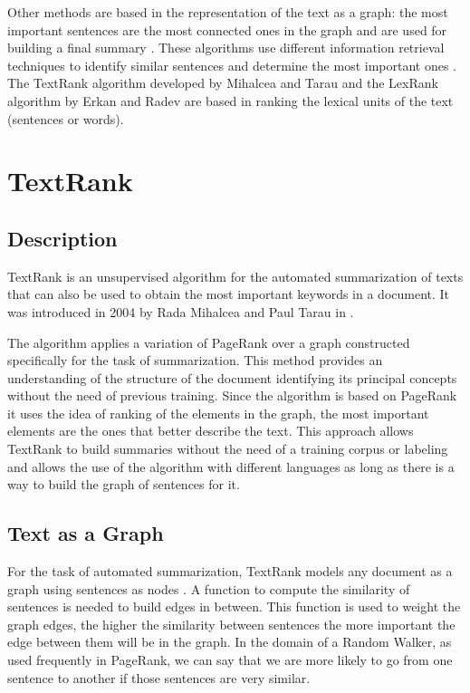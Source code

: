 \documentclass{llncs}
\begin{document}
Other methods are based in the representation of the text as a graph: the most important sentences are the most connected ones in the graph and are used for building a final summary \cite{barzilay}. These algorithms use different information retrieval techniques to identify similar sentences and determine the most important ones \cite{salton}. The TextRank algorithm developed by Mihalcea and Tarau \cite{mihalcea-tarau} and the LexRank algorithm by Erkan and Radev \cite{erkan} are based in ranking the lexical units of the text (sentences or words).

\section{TextRank}

\subsection{Description}
TextRank is an unsupervised algorithm for the automated summarization of texts that can also be used to obtain the most important keywords in a document. It was introduced in 2004 by Rada Mihalcea and Paul Tarau in \cite{mihalcea-tarau}.

The algorithm applies a variation of PageRank \cite{pageetal98} over a graph constructed specifically for the task of summarization. This method provides an understanding of the structure of the document identifying its principal concepts without the need of previous training. Since the algorithm is based on PageRank it uses the idea of ranking of the elements in the graph, the most important elements are the ones that better describe the text. This approach allows TextRank to build summaries without the need of a training corpus or labeling and allows the use of the algorithm with different languages as long as there is a way to build the graph of sentences for it.

\subsection{Text as a Graph}
For the task of automated summarization, TextRank models any document as a graph using sentences as nodes \cite{introductionir}. A function to compute the similarity of sentences is needed to build edges in between. This function is used to weight the graph edges, the higher the similarity between sentences the more important the edge between them will be in the graph. In the domain of a Random Walker, as used frequently in PageRank, we can say that we are more likely to go from one sentence to another if those sentences are very similar. 
\end{document}
